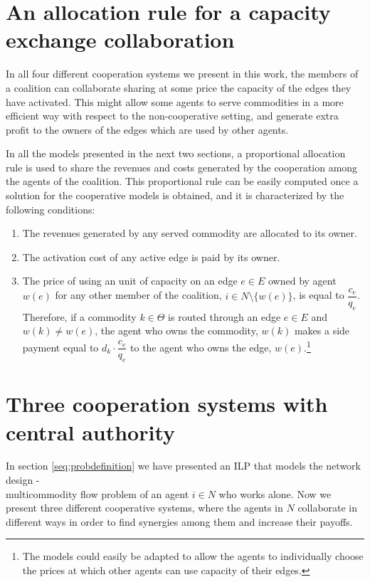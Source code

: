 \documentclass{article}
\begin{document}
\section{An allocation rule for a capacity exchange collaboration}
\label{seq:allocrule}
In all four different cooperation systems we present in this work, the members of a coalition can collaborate sharing at some price the capacity of the edges they have activated. This might allow some agents to serve commodities in a more efficient way with respect to the non-cooperative setting, and generate extra profit to the owners of the edges which are used by other agents.

In all the models presented in the next two sections, a proportional allocation rule is used to share the revenues and costs generated by the cooperation among the agents of the coalition. This proportional rule can be easily computed once a solution for the cooperative models is obtained, and it is characterized by the following conditions:
\begin{enumerate}
    \item The revenues generated by any served commodity are
    allocated to its owner.
    \item The activation cost of any active edge is paid by its owner.
    \item The price of using an unit of capacity on an edge $e\in E$ owned by agent $w(e)$ for any other member of the coalition, $i\in N\setminus\{w(e)\}$, is equal to $\dfrac{c_e}{q_e}$. Therefore,  if a commodity $k\in \Theta$ is routed through an edge $e	\in E$ and $w(k)\not = w(e)$, the agent who owns the commodity, $w(k)$ makes a side payment equal to $d_k \cdot\dfrac{c_e}{q_e}$ to the agent who owns the edge, $w(e)$.\footnote{The models could easily be adapted to allow the agents to individually choose the prices at which other agents can use capacity of their edges.}
\end{enumerate}

\section{Three cooperation systems with central authority} \label{seq:centrmodels}

In section \ref{seq:probdefinition} we have presented an ILP that models the network design -\\ multicommodity flow problem of an agent $i\in N$ who works alone. Now we present three different cooperative systems, where the agents in $N$ collaborate in different ways in order to find synergies among them and increase their payoffs.
\end{document}
